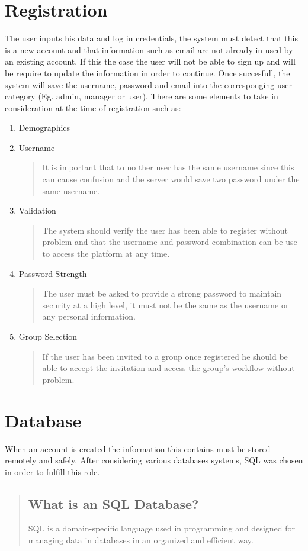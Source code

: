 \documentclass{article}
\begin{document}
\section{Registration}
The user inputs his data and log in credentials, the system must detect that this is a new account and that information such as email are not already in used by an existing account. If this the case the user will not be able to sign up and will be require to update the information in order to continue. Once succesfull, the system will save the username, password and email into the corresponging user category (Eg. admin, manager or user). There are some elements to take in consideration at the time of registration such as:
\begin{enumerate}
  \item Demographics

  \item Username
  \begin{quote}
    It is important that to no ther user has the same username since this can cause confusion and the server would save two password under the same username.
  \end{quote}

  \item Validation
  \begin{quote}
    The system should verify the user has been able to register without problem and that the username and password combination can be use to access the platform at any time.
  \end{quote}

  \item Password Strength
  \begin{quote}
    The user must be asked to provide a strong password to maintain security at a high level, it must not be the same as the username or any personal information.
  \end{quote}

  \item Group Selection
  \begin{quote}
    If the user has been invited to a group once registered he should be able to accept the invitation and access the group's workflow without problem.
  \end{quote}
\end{enumerate}

\section{Database}
When an account is created the information this contains must be stored remotely and safely. After considering various databases systems, SQL was chosen in order to fulfill this role.
\begin{quote}
  \subsection{What is an SQL Database?}
    SQL is a domain-specific language used in programming and designed for managing data in databases in an organized and efficient way.

\end{quote}
\end{document}
